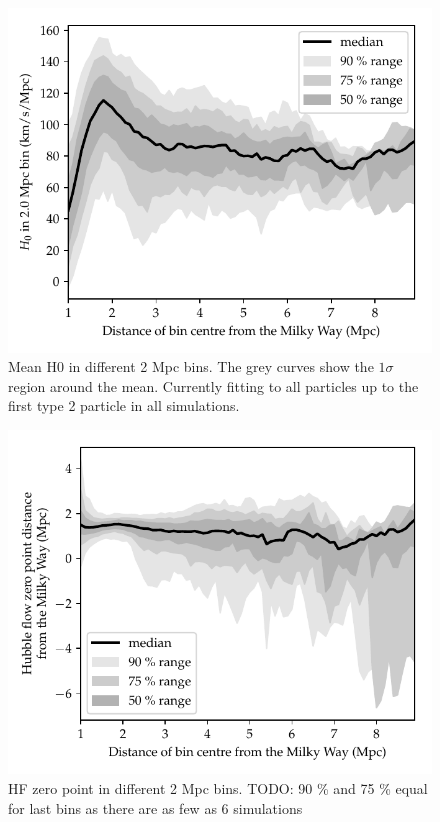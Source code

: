 \documentclass[english, oneside]{HYgradu}
\begin{document}
\begin{figure}
    \centering
    \includegraphics{kuvat/shelledH0.pdf}
    \caption{Mean H0 in different 2 Mpc bins. The grey curves show the $1 \sigma$ region around the mean. Currently fitting to all particles up to the first type 2 particle in all simulations.}\label{fig:shelledH0}
\end{figure}

\begin{figure}
    \centering
    \includegraphics{kuvat/zeros.pdf}
    \caption{HF zero point in different 2 Mpc bins. TODO: 90 \% and 75 \% equal for last bins as there are as few as 6 simulations}\label{fig:zeros}
\end{figure}
\end{document}
